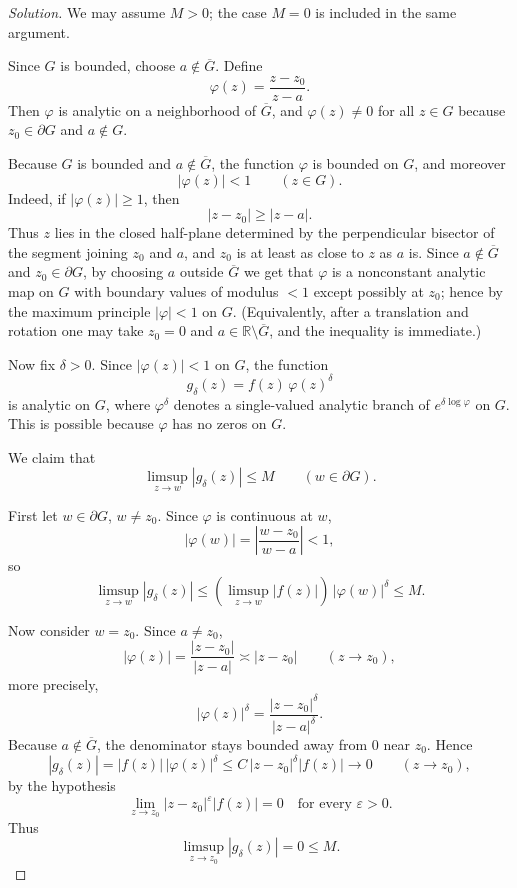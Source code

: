 \documentclass[12pt, a4paper]{report}
\theoremstyle{spaced}
\begin{document}
\begin{proof}[Solution]
	We may assume \(M>0\); the case \(M=0\) is included in the same argument.

	Since \(G\) is bounded, choose \(a\notin \overline G\). Define
	\[
		\varphi(z)=\frac{z-z_0}{z-a}.
	\]
	Then \(\varphi\) is analytic on a neighborhood of \(\overline G\), and \(\varphi(z)\neq 0\) for all \(z\in G\) because \(z_0\in \partial G\) and \(a\notin G\).

	Because \(G\) is bounded and \(a\notin \overline G\), the function \(\varphi\) is bounded on \(G\), and moreover
	\[
		|\varphi(z)|<1 \qquad (z\in G).
	\]
	Indeed, if \(|\varphi(z)|\ge 1\), then
	\[
		|z-z_0|\ge |z-a|.
	\]
	Thus \(z\) lies in the closed half-plane determined by the perpendicular bisector of the segment joining \(z_0\) and \(a\), and \(z_0\) is at least as close to \(z\) as \(a\) is. Since \(a\notin \overline G\) and \(z_0\in \partial G\), by choosing \(a\) outside \(\overline G\) we get that \(\varphi\) is a nonconstant analytic map on \(G\) with boundary values of modulus \(<1\) except possibly at \(z_0\); hence by the maximum principle \(|\varphi|<1\) on \(G\). (Equivalently, after a translation and rotation one may take \(z_0=0\) and \(a\in\mathbb R\setminus \overline G\), and the inequality is immediate.)

	Now fix \(\delta>0\). Since \(|\varphi(z)|<1\) on \(G\), the function
	\[
		g_\delta(z)=f(z)\,\varphi(z)^\delta
	\]
	is analytic on \(G\), where \(\varphi^\delta\) denotes a single-valued analytic branch of \(e^{\delta\log\varphi}\) on \(G\). This is possible because \(\varphi\) has no zeros on \(G\).

	We claim that
	\[
		\limsup_{z\to w}|g_\delta(z)|\le M \qquad (w\in \partial G).
	\]

	First let \(w\in \partial G\), \(w\neq z_0\). Since \(\varphi\) is continuous at \(w\),
	\[
		|\varphi(w)|=\left|\frac{w-z_0}{w-a}\right|<1,
	\]
	so
	\[
		\limsup_{z\to w}|g_\delta(z)|
		\le \left(\limsup_{z\to w}|f(z)|\right)\,|\varphi(w)|^\delta
		\le M.
	\]

	Now consider \(w=z_0\). Since \(a\neq z_0\),
	\[
		|\varphi(z)|=\frac{|z-z_0|}{|z-a|}
		\asymp |z-z_0|
		\qquad (z\to z_0),
	\]
	more precisely,
	\[
		|\varphi(z)|^\delta
		=\frac{|z-z_0|^\delta}{|z-a|^\delta}.
	\]
	Because \(a\notin \overline G\), the denominator stays bounded away from \(0\) near \(z_0\). Hence
	\[
		|g_\delta(z)|
		=|f(z)|\,|\varphi(z)|^\delta
		\le C\,|z-z_0|^\delta |f(z)|
		\to 0
		\qquad (z\to z_0),
	\]
	by the hypothesis
	\[
		\lim_{z\to z_0}|z-z_0|^\varepsilon |f(z)|=0
		\quad\text{for every }\varepsilon>0.
	\]
	Thus
	\[
		\limsup_{z\to z_0}|g_\delta(z)|=0\le M.
	\]


\end{proof}
\end{document}
